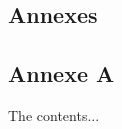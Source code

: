 \begin{appendices}

\chapter{Annexes}

\section{Annexe A}
    The contents...


\end{appendices}
  
  